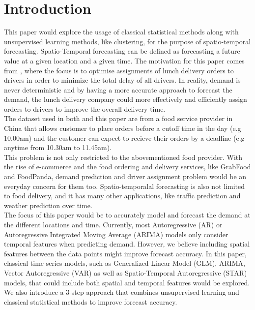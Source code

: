 \documentclass[nonblindrev,msom]{informs3} %
\begin{document}

\newpage
\section{Introduction}

This paper would explore the usage of classical statistical methods along with unsupervised learning methods, like clustering, for the purpose of spatio-temporal forecasting. Spatio-Temporal forecasting can be defined as forecasting a future value at a given location and a given time. The motivation for this paper comes from \cite{liu2020time}, where the focus is to optimise assignments of lunch delivery orders to drivers in order to minimize the total delay of all drivers. In reality, demand is never deterministic and by having a more accurate approach to forecast the demand, the lunch delivery company could more effectively and efficiently assign orders to drivers to improve the overall delivery time. \\

\noindent The dataset used in both \cite{liu2020time} and this paper are from a food service provider in China that allows customer to place orders before a cutoff time in the day (e.g 10.00am) and the customer can expect to recieve their orders by a deadline (e.g anytime from 10.30am to 11.45am). \\

\noindent This problem is not only restricted to the abovementioned food provider. With the rise of e-commerce and the food ordering and delivery services, like GrabFood and FoodPanda, demand prediction and driver assignment problem would be an everyday concern for them too. Spatio-temporalal forecasting is also not limited to food delivery, and it has many other applications, like traffic prediction and weather prediction over time. \\

\noindent The focus of this paper would be to accurately model and forecast the demand at the different locations and time. Currently, most Autoregressive (AR) or Autoregressive Integrated Moving Average (ARIMA) models only consider temporal features when predicting demand. However, we believe including spatial features between the data points might improve forecast accuracy. In this paper, classical time series models, such as Generalized Linear Model (GLM), ARIMA, Vector Autoregressive (VAR) as well as Spatio-Temporal Autoregressive (STAR) models, that could include both spatial and temporal features would be explored. We also introduce a 3-step approach that combines unsupervised learning and classical statistical methods to improve forecast accuracy. 
\end{document}
